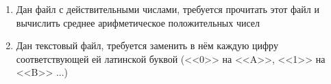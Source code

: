 \begin{enumerate}
    \item Дан файл с действительными числами, требуется прочитать этот файл и вычислить среднее арифметическое положительных чисел
    \item Дан текстовый файл, требуется заменить в нём каждую цифру соответствующей ей латинской буквой (<<0>> на <<A>>, <<1>> на <<B>> ...)
    
\end{enumerate}